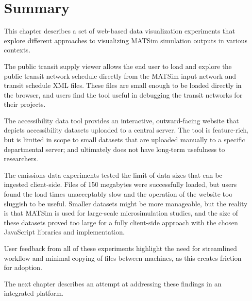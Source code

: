 \hypertarget{server-experiments-summary}{%
\section{Summary}\label{server-experiments-summary}}

This chapter describes a set of web-based data visualization experiments that explore different approaches to visualizing MATSim simulation outputs in various contexts.

The public transit supply viewer allows the end user to load and explore the public transit network schedule directly from the MATSim input network and transit schedule XML files. These files are small enough to be loaded directly in the browser, and users find the tool useful in debugging the transit networks for their projects.

The accessibility data tool provides an interactive, outward-facing website that depicts accessibility datasets uploaded to a central server. The tool is feature-rich, but is limited in scope to small datasets that are uploaded manually to a specific departmental server; and ultimately does not have long-term usefulness to researchers.

The emissions data experiments tested the limit of data sizes that can be ingested client-side. Files of 150 megabytes were successfully loaded, but users found the load times unacceptably slow and the operation of the website too sluggish to be useful. Smaller datasets might be more manageable, but the reality is that MATSim is used for large-scale microsimulation studies, and the size of these datasets proved too large for a fully client-side approach with the chosen JavaScript libraries and implementation.

User feedback from all of these experiments highlight the need for streamlined workflow and minimal copying of files between machines, as this creates friction for adoption.

The next chapter describes an attempt at addressing these findings in an integrated platform.
